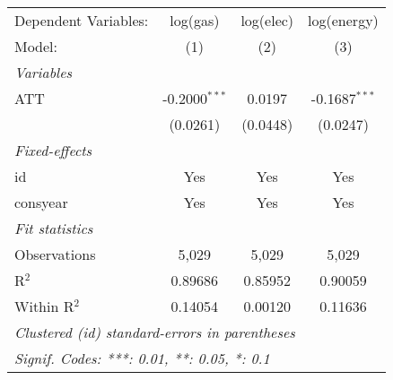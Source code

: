 
\begingroup
\centering
\begin{tabular}{lccc}
   \tabularnewline \midrule \midrule
   Dependent Variables: & log(gas)        & log(elec) & log(energy)\\  
   Model:               & (1)             & (2)       & (3)\\  
   \midrule
   \emph{Variables}\\
   ATT                  & -0.2000$^{***}$ & 0.0197    & -0.1687$^{***}$\\   
                        & (0.0261)        & (0.0448)  & (0.0247)\\   
   \midrule
   \emph{Fixed-effects}\\
   id                   & Yes             & Yes       & Yes\\  
   consyear             & Yes             & Yes       & Yes\\  
   \midrule
   \emph{Fit statistics}\\
   Observations         & 5,029           & 5,029     & 5,029\\  
   R$^2$                & 0.89686         & 0.85952   & 0.90059\\  
   Within R$^2$         & 0.14054         & 0.00120   & 0.11636\\  
   \midrule \midrule
   \multicolumn{4}{l}{\emph{Clustered (id) standard-errors in parentheses}}\\
   \multicolumn{4}{l}{\emph{Signif. Codes: ***: 0.01, **: 0.05, *: 0.1}}\\
\end{tabular}
\par\endgroup


